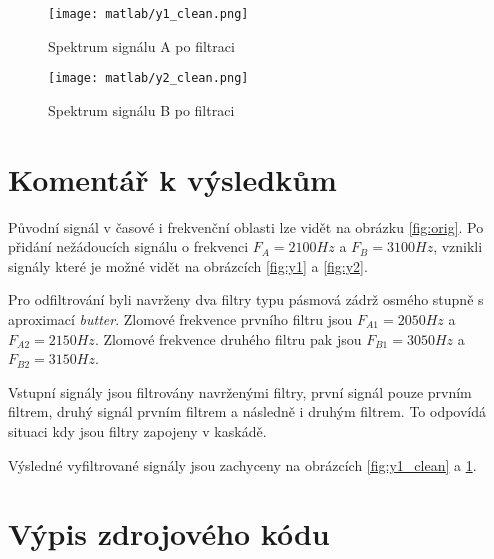 \documentclass[11pt, a4paper]{article}
\begin{document}
            \begin{figure}[H]
                \centering
                \begin{minipage}{.5\textwidth}
                    \centering
                    \texttt{[image: matlab/y1\_clean.png]}
                    \caption{Spektrum signálu A po filtraci}
                    \label{fig:y1_clean}
                \end{minipage}%
                \begin{minipage}{.5\textwidth}
                    \centering
                    \texttt{[image: matlab/y2\_clean.png]}
                    \caption{Spektrum signálu B po filtraci}
                    \label{fig:y2_clean}
                \end{minipage}
            \end{figure}
        
    
    \section{Komentář k výsledkům}
    
        Původní signál v časové i frekvenční oblasti lze vidět na 
        obrázku \ref{fig:orig}. Po přidání nežádoucích signálu o 
        frekvenci $F_A = 2100 Hz$ a $F_B = 3100 Hz$, vznikli signály 
        které je možné vidět na obrázcích \ref{fig:y1} a \ref{fig:y2}. 
        
        Pro odfiltrování byli navrženy dva filtry typu pásmová zádrž 
        osmého stupně s aproximací \textit{butter}. Zlomové frekvence 
        prvního filtru jsou $F_{A1} = 2050 Hz$ a $F_{A2} = 2150 Hz$. 
        Zlomové frekvence druhého filtru pak jsou $F_{B1} = 3050 Hz$ a 
        $F_{B2} = 3150 Hz$.
        
        Vstupní signály jsou filtrovány navrženými filtry, první signál 
        pouze prvním filtrem, druhý signál prvním filtrem a následně i 
        druhým filtrem. To odpovídá situaci kdy jsou filtry zapojeny v 
        kaskádě.
        
        Výsledné vyfiltrované signály jsou zachyceny na obrázcích 
        \ref{fig:y1_clean} a \ref{fig:y2_clean}.
                    
                    
    \section{Výpis zdrojového kódu}
    
\end{document}
